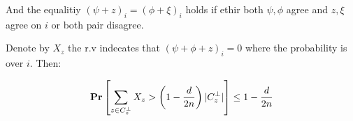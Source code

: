 \documentclass[manuscript,screen,review]{acmart}
\begin{document}
And the equalitiy $ \left( \psi + z \right)_{i} = \left( \phi + \xi  \right)_{i}  $ holds if ethir both $\psi, \phi$ agree and $ z, \xi$ agree on $i$ or both pair disagree.   

\begin{lemma}
  Denote by $X_{z}$ the r.v indecates that $\left(\psi + \phi + z\right)_{i} = 0 $ where the probability is over $i$. Then:

  \begin{equation*}
    \begin{split}
      \mathbf{Pr} \left[ \sum_{z\in C_{z}^{\perp}}{X_{z}} > \left( 1 - \frac{d}{2n} \right)|C_{z}^{\perp}|   \right] \le 1 - \frac{d}{2n}  
    \end{split}
  \end{equation*}
\end{lemma}
\end{document}
